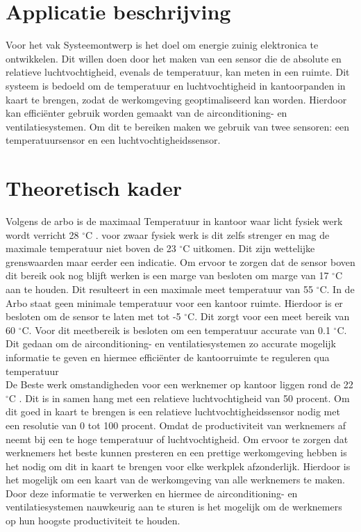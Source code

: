 \newpage
\section{Applicatie beschrijving}
Voor het vak Systeemontwerp is het doel om energie zuinig elektronica te ontwikkelen. Dit willen doen door het maken van een sensor die de absolute en relatieve luchtvochtigheid, evenals de temperatuur, kan meten in een ruimte. Dit systeem is bedoeld om de temperatuur en luchtvochtigheid in kantoorpanden in kaart te brengen, zodat de werkomgeving geoptimaliseerd kan worden. Hierdoor kan efficiënter gebruik worden gemaakt van de airconditioning- en ventilatiesystemen. Om dit te bereiken maken we gebruik van twee sensoren: een temperatuursensor en een luchtvochtigheidssensor.
\section{Theoretisch kader}
\label{Theoretisch_kader}
Volgens de arbo is de maximaal Temperatuur in kantoor waar licht fysiek werk wordt verricht 28 $^\circ\text{C}$ \cite{ARBO_temperatuur_regels}. voor zwaar fysiek werk is dit zelfs strenger en mag de maximale temperatuur niet boven de 23 $^\circ\text{C}$ uitkomen. Dit zijn wettelijke grenswaarden maar eerder een indicatie. Om ervoor te zorgen dat de sensor boven dit bereik ook nog blijft werken is een marge van besloten om marge van 17 $^\circ\text{C}$ aan te houden. Dit resulteert in een maximale meet temperatuur van 55 $^\circ\text{C}$. In de Arbo staat geen minimale temperatuur voor een kantoor ruimte. Hierdoor is er besloten om de sensor te laten met tot -5 $^\circ\text{C}$. Dit zorgt voor een meet bereik van 60 $^\circ\text{C}$. Voor dit meetbereik is besloten om een temperatuur accurate van 0.1 $^\circ\text{C}$. Dit gedaan om de airconditioning- en ventilatiesystemen zo accurate mogelijk informatie te geven en hiermee efficiënter de kantoorruimte te reguleren qua temperatuur
\newline
\\
De Beste werk omstandigheden voor een werknemer op kantoor liggen rond de 22 $^\circ\text{C}$ \cite{Beste_werk_omstandigheden}. Dit is in samen hang met een relatieve luchtvochtigheid van 50 procent. Om dit goed in kaart te brengen is een relatieve luchtvochtigheidssensor nodig met een resolutie van 0 tot 100 procent. Omdat de productiviteit van werknemers af neemt bij een te hoge temperatuur of luchtvochtigheid. Om ervoor te zorgen dat werknemers het beste kunnen presteren en een prettige werkomgeving hebben is het nodig om dit in kaart te brengen voor elke werkplek afzonderlijk. Hierdoor is het mogelijk om een kaart van de werkomgeving van alle werknemers te maken. Door deze informatie te verwerken en hiermee de airconditioning- en ventilatiesystemen nauwkeurig aan te sturen is het mogelijk om de werknemers op hun hoogste productiviteit te houden.